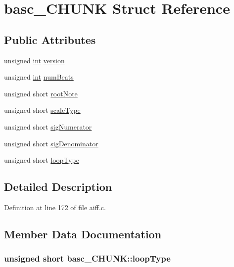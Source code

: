 \hypertarget{structbasc___c_h_u_n_k}{}\section{basc\+\_\+\+C\+H\+U\+NK Struct Reference}
\label{structbasc___c_h_u_n_k}
\subsection*{Public Attributes}
\begin{DoxyCompactItemize}
\item 
unsigned \hyperlink{xmltok_8h_a5a0d4a5641ce434f1d23533f2b2e6653}{int} \hyperlink{structbasc___c_h_u_n_k_a700c7237df97d97b0702327ec6a1ce14}{version}
\item 
unsigned \hyperlink{xmltok_8h_a5a0d4a5641ce434f1d23533f2b2e6653}{int} \hyperlink{structbasc___c_h_u_n_k_aceb2b8716e6feca9610fab852697de66}{num\+Beats}
\item 
unsigned short \hyperlink{structbasc___c_h_u_n_k_aaa602d3a4f00e4bb6dc365c2d0eb72ba}{root\+Note}
\item 
unsigned short \hyperlink{structbasc___c_h_u_n_k_ad1611912fcb417ea4ab9c8ba34c0e429}{scale\+Type}
\item 
unsigned short \hyperlink{structbasc___c_h_u_n_k_a42b70974b20a502e483eb1a329650b2b}{sig\+Numerator}
\item 
unsigned short \hyperlink{structbasc___c_h_u_n_k_a187a85977f0cb89e02f91898f978523c}{sig\+Denominator}
\item 
unsigned short \hyperlink{structbasc___c_h_u_n_k_af68613746a06643c45f57758033d6cf4}{loop\+Type}
\end{DoxyCompactItemize}


\subsection{Detailed Description}


Definition at line 172 of file aiff.\+c.



\subsection{Member Data Documentation}
\subsubsection[{\texorpdfstring{loop\+Type}{loopType}}]{\setlength{\rightskip}{0pt plus 5cm}unsigned short basc\+\_\+\+C\+H\+U\+N\+K\+::loop\+Type}\hypertarget{structbasc___c_h_u_n_k_af68613746a06643c45f57758033d6cf4}{}\label{structbasc___c_h_u_n_k_af68613746a06643c45f57758033d6cf4}


